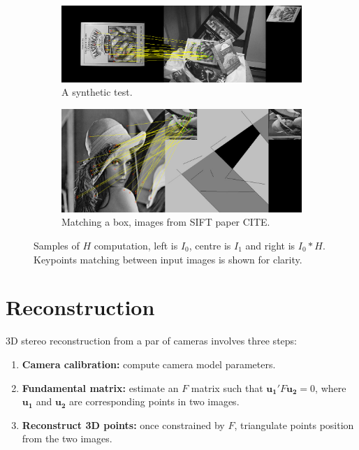 \documentclass[12pt]{article}
\begin{document}
\begin{figure}[htbp!]
        \centering
        \begin{subfigure}[b]{0.7\textwidth}
                \includegraphics[width=\textwidth]{images/ransac1}
                \caption{A synthetic test.}
                \label{fig:ransac1}
        \end{subfigure}    
        \begin{subfigure}[b]{0.7\textwidth}
                \includegraphics[width=\textwidth]{images/ransac2}
                \caption{Matching a box, images from SIFT paper CITE.}
                \label{fig:ransac2}
        \end{subfigure} 
        \caption{Samples of $H$ computation, left is $I_0$, centre is $I_1$ and right is $I_0 * H$. Keypoints matching between input images is shown for clarity.}\label{fig:ransacSample}
\end{figure}

\FloatBarrier
\section{Reconstruction}

3D stereo reconstruction from a par of cameras involves three steps:
\begin{enumerate}
\item \textbf{Camera calibration:} compute camera model parameters.
\item \textbf{Fundamental matrix:} estimate an $F$ matrix such that $\mathbf{u_1}'F\mathbf{u_2} = 0$, where $\mathbf{u_1}$ and $\mathbf{u_2}$ are corresponding points in two images.
\item \textbf{Reconstruct 3D points:} once constrained by $F$, triangulate points position from the two images.
\end{enumerate}
\end{document}
